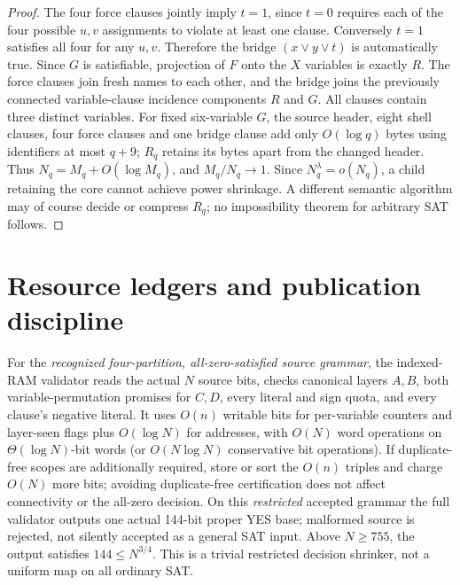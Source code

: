 \documentclass[11pt]{article}
\begin{document}
\begin{proof}
The four force clauses jointly imply $t=1$, since $t=0$ requires each of the four possible $u,v$ assignments to violate at least one clause. Conversely $t=1$ satisfies all four for any $u,v$. Therefore the bridge $(x\vee y\vee t)$ is automatically true. Since $G$ is satisfiable, projection of $F$ onto the $X$ variables is exactly $R$. The force clauses join fresh names to each other, and the bridge joins the previously connected variable-clause incidence components $R$ and $G$. All clauses contain three distinct variables. For fixed six-variable $G$, the source header, eight shell clauses, four force clauses and one bridge clause add only $O(\log q)$ bytes using identifiers at most $q+9$; $R_q$ retains its bytes apart from the changed header. Thus $N_q=M_q+O(\log M_q)$, and $M_q/N_q\to1$. Since $N_q^\lambda=o(N_q)$, a child retaining the core cannot achieve power shrinkage. A different semantic algorithm may of course decide or compress $R_q$; no impossibility theorem for arbitrary SAT follows.
\end{proof}

\section{Resource ledgers and publication discipline}
For the \emph{recognized four-partition, all-zero-satisfied source grammar}, the indexed-RAM validator reads the actual $N$ source bits, checks canonical layers $A,B$, both variable-permutation promises for $C,D$, every literal and sign quota, and every clause's negative literal. It uses $O(n)$ writable bits for per-variable counters and layer-seen flags plus $O(\log N)$ for addresses, with $O(N)$ word operations on $\Theta(\log N)$-bit words (or $O(N\log N)$ conservative bit operations). If duplicate-free scopes are additionally required, store or sort the $O(n)$ triples and charge $O(N)$ more bits; avoiding duplicate-free certification does not affect connectivity or the all-zero decision. On this \emph{restricted} accepted grammar the full validator outputs one actual 144-bit proper YES base; malformed source is rejected, not silently accepted as a general SAT input. Above $N\ge755$, the output satisfies $144\le N^{3/4}$. This is a trivial restricted decision shrinker, not a uniform map on all ordinary SAT.
\end{document}
